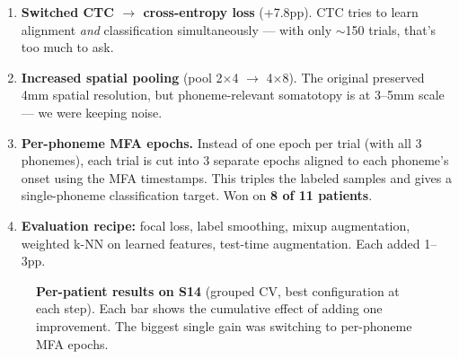 \documentclass[11pt]{article}
\begin{document}
\begin{enumerate}[nosep]
    \item \textbf{Switched CTC $\to$ cross-entropy loss} (+7.8pp). CTC tries to learn alignment \textit{and} classification simultaneously --- with only $\sim$150 trials, that's too much to ask.
    \item \textbf{Increased spatial pooling} (pool 2$\times$4 $\to$ 4$\times$8). The original preserved 4mm spatial resolution, but phoneme-relevant somatotopy is at 3--5mm scale --- we were keeping noise.
    \item \textbf{Per-phoneme MFA epochs.} Instead of one epoch per trial (with all 3 phonemes), each trial is cut into 3 separate epochs aligned to each phoneme's onset using the MFA timestamps. This triples the labeled samples and gives a single-phoneme classification target. Won on \textbf{8 of 11 patients}.
    \item \textbf{Evaluation recipe:} focal loss, label smoothing, mixup augmentation, weighted k-NN on learned features, test-time augmentation. Each added 1--3pp.
\end{enumerate}

\begin{figure}[ht]
\centering
{}
\caption{\textbf{Per-patient results on S14} (grouped CV, best configuration at each step). Each bar shows the cumulative effect of adding one improvement. The biggest single gain was switching to per-phoneme MFA epochs.}
\label{fig:progression}
\end{figure}
\end{document}
